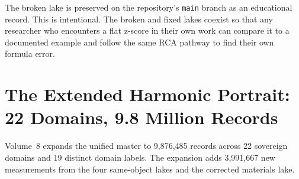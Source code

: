 \documentclass[11pt, letterpaper, openany]{book}
\begin{document}
The broken lake is preserved on the repository's \texttt{main} branch as an
educational record. This is intentional. The broken and fixed lakes coexist so that
any researcher who encounters a flat z-score in their own work can compare it to a
documented example and follow the same RCA pathway to find their own formula error.

\clearpage

\chapter{The Extended Harmonic Portrait: 22 Domains, 9.8 Million Records}

Volume~8 expands the unified master to 9,876,485 records across 22 sovereign domains
and 19 distinct domain labels. The expansion adds 3,991,667 new measurements from
the four same-object lakes and the corrected materials lake.
\end{document}

